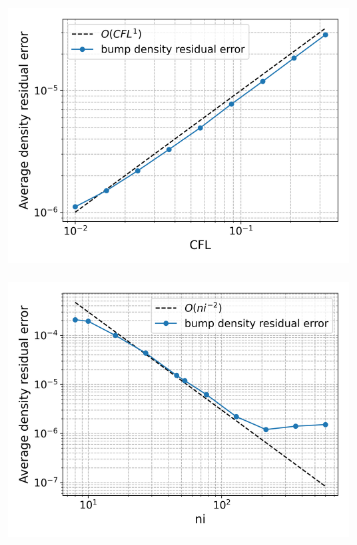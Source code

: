 \documentclass{article}
\begin{document}
\begin{figure}[H]
    \centering
    \begin{subfigure}{0.49\textwidth}
        \centering
        \includegraphics[width=0.99\textwidth]{figures/bump_d_avg_cfl.png}
        \caption{}
        \label{fig:bump_d_avg_cfl}
    \end{subfigure}
    \begin{subfigure}{0.49\textwidth}
        \centering
        \includegraphics[width=0.99\textwidth]{figures/bump_d_avg_ni.png}
        \caption{}
        \label{fig:bump_d_avg_ni}
    \end{subfigure}
\end{figure}
\end{document}
